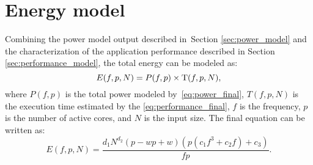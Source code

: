 \section{Energy model} \label{sec:energy_model}
Combining the power model output described in~Section \ref{sec:power_model} and the characterization of the application performance described in Section \ref{sec:performance_model}, the total energy can be modeled as:
\begin{equation}
	E(f,p,N)=P(f,p)\times{\rm T}(f,p,N),
	\label{eq:en_combination}
\end{equation}
where $P(f,p)$ is the total power modeled by~\cref{eq:power_final}, ${T}(f,p,N)$ is the execution time estimated by the \cref{eq:performance_final}, $f$ is the frequency, $p$ is the number of active cores, and $N$ is the input size. The final equation can be written as:
\begin{equation}
	E(f,p,N)=\frac{d_1N^{d_2}(p-wp+w)(p(c_1f^3+c_2f)+c_3)}{fp}.
	\label{eq:en_final}
\end{equation}